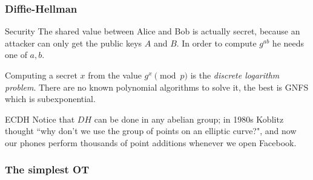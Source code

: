 \documentclass{beamer}
\begin{document}
    \begin{frame}
        \frametitle{Diffie-Hellman}
        \begin{block}{Security}
            The shared value between Alice and Bob is actually secret, because an attacker can only get the public keys $A$ and $B$. In order to compute $g^{ab}$ he needs one of $a,b$.
            
            Computing a secret $x$ from the value $g^x\pmod p$ is the \emph{discrete logarithm problem}. There are no known polynomial algorithms to solve it, the best is GNFS which is subexponential.
        \end{block}
    
        \pause
        \begin{block}{ECDH}
            Notice that $DH$ can be done in any abelian group; in 1980s Koblitz thought ``why don't we use the group of points on an elliptic curve?", and now our phones perform thousands of point additions whenever we open Facebook.
        \end{block}
    \end{frame}

    \begin{frame}
        \frametitle{The simplest OT}
        
        \begin{center}
        \end{center}
    \end{frame}
\end{document}

